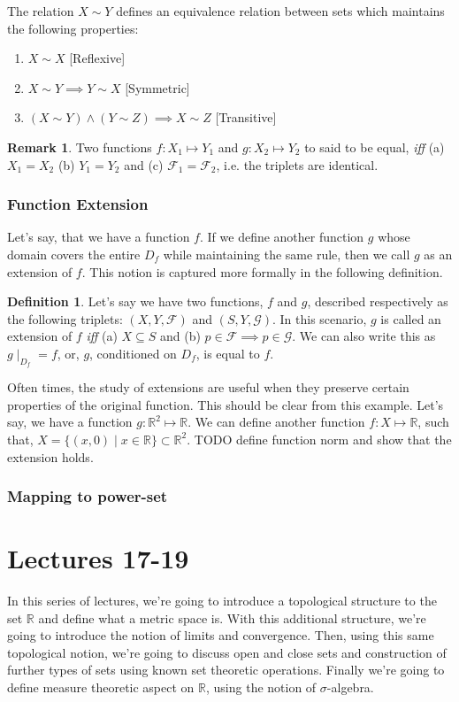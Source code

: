\documentclass{report}
\theoremstyle{plain}
\theoremstyle{definition}
\newtheorem{definition}[theorem]{Definition} %
\newtheorem{remark}[theorem]{Remark} %
\begin{document}
\noindent The relation $X\sim Y$ defines an equivalence relation between sets which maintains the following properties:
\begin{enumerate}
\item $X\sim X$ [Reflexive]
\item $X\sim Y\implies Y\sim X$ [Symmetric]
\item $(X\sim Y)\wedge(Y\sim Z)\implies X\sim Z$ [Transitive]
\end{enumerate}

\begin{remark}
Two functions $f:X_1\mapsto Y_1$ and $g:X_2\mapsto Y_2$ to said to be equal, \emph{iff} (a) $X_1 = X_2$ (b) $Y_1 = Y_2$ and (c) $\mathcal{F}_1 = \mathcal{F}_2$, i.e. the triplets are identical.
\end{remark}
\subsection{Function Extension}
Let's say, that we have a function $f$. If we define another function $g$ whose domain covers the entire $D_f$ while maintaining the same rule, then we call $g$ as an extension of $f$. This notion is captured more formally in the following definition.
\begin{definition}
Let's say we have two functions, $f$ and $g$, described respectively as the following triplets: $(X,Y,\mathcal{F})$ and $(S,Y,\mathcal{G})$. In this scenario, $g$ is called an extension of $f$ \emph{iff} (a) $X\subseteq S$ and (b) $p\in\mathcal{F}\implies p\in\mathcal{G}$. We can also write this as $g\mid_{D_f} = f$, or, $g$, conditioned on $D_f$, is equal to $f$.
\end{definition}
\noindent Often times, the study of extensions are useful when they preserve certain properties of the original function. This should be clear from this example. Let's say, we have a function $g:\mathbb{R}^2\mapsto \mathbb{R}$. We can define another function $f:X\mapsto \mathbb{R}$, such that, $X=\{(x,0)\mid x\in\mathbb{R}\}\subset\mathbb{R}^2$.
TODO define function norm and show that the extension holds.
\subsection{Mapping to power-set}
\chapter{Lectures 17-19}
In this series of lectures, we're going to introduce a topological structure to the set $\mathbb{R}$ and define what a metric space is. With this additional structure, we're going to introduce the notion of limits and convergence. Then, using this same topological notion, we're going to discuss open and close sets and construction of further types of sets using known set theoretic operations. Finally we're going to define measure theoretic aspect on $\mathbb{R}$, using the notion of $\sigma$-algebra.
\end{document}
